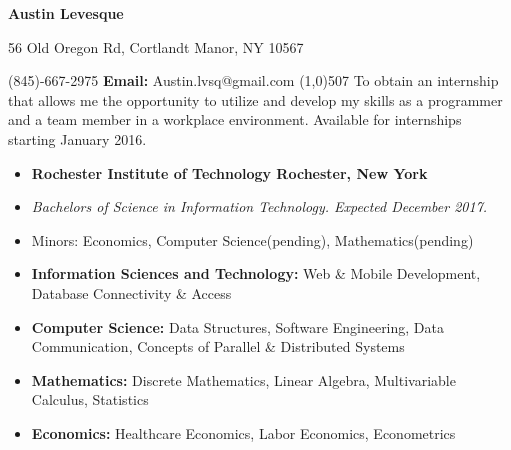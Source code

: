 \documentclass[10pt]{article}
\begin{document}
\centerline{\Large \bf Austin Levesque}
\vspace{.5ex}
\centerline{56 Old Oregon Rd, Cortlandt Manor, NY 10567}
\vspace{1ex}
 (845)-667-2975 \hfill {\bf Email:} Austin.lvsq@gmail.com
\line(1,0){507}
\vspace{2ex}
To obtain an internship that allows me the opportunity to utilize and develop my skills as a programmer and a team member in a workplace environment. Available for internships starting January 2016.
\vspace{1ex}\\
\begin{itemize}[topsep=1ex, itemsep=0ex, partopsep=0ex, parsep=0ex]
	\item[]{{\bf Rochester Institute of Technology \hfill Rochester, New York}}
  \item[]{\it Bachelors of Science in Information Technology. \hfill Expected December 2017.}
  \item[] Minors: Economics, Computer Science(pending), Mathematics(pending)
\end{itemize}
\vspace{1ex}
\begin{itemize}[topsep=0.3ex, itemsep=0ex, partopsep=0ex, parsep=0ex]
	\item[] {\bf Information Sciences and Technology:} Web \& Mobile Development, Database Connectivity \& Access
	\item[] {\bf Computer Science:} Data Structures, Software Engineering, Data Communication, Concepts of Parallel \& Distributed Systems
	\item[] {\bf Mathematics:} Discrete Mathematics, Linear Algebra, Multivariable Calculus, Statistics
	\item[] {\bf Economics:} Healthcare Economics, Labor Economics, Econometrics
\end{itemize}
\vspace{1ex}
\end{document}
